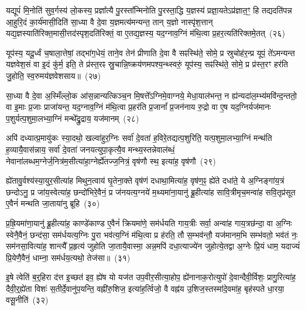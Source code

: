 यद्यूपं॑ मि॒नोति॑ सुव॒र्गस्य॑ लो॒कस्य॒ प्रज्ञा᳚त्यै पु॒रस्ता᳚न्मिनोति पु॒रस्ता॒द्धि य॒ज्ञस्य॑ प्रज्ञा॒यते\-ऽप्र॑ज्ञात॒ꣳ॒ हि तद्यदति॑पन्न आ॒हुरि॒दं का॒र्य॑मासी॒दिति॑ सा॒ध्या वै दे॒वा य॒ज्ञमत्य॑मन्यन्त॒ तान् य॒ज्ञो नास्पृ॑श॒त्तान् यद्य॒ज्ञस्याति॑रिक्त॒मासी॒त्तद॑स्पृश॒\-दति॑रिक्तं॒ वा ए॒तद्य॒ज्ञस्य॒ यद॒ग्नाव॒ग्निं म॑थि॒त्वा प्र॒हर॒त्यति॑रिक्तमे॒तत्~(२६)\ip

यूप॑स्य॒ यदू॒र्ध्वं च॒षाला॒त्तेषां॒ तद्भा॑ग॒धेयं॒ ताने॒व तेन॑ प्रीणाति दे॒वा वै सꣴस्थि॑ते॒ सोमे॒ प्र स्रुचोह॑र॒न्प्र यूपं॒ ते॑\-ऽमन्यन्त यज्ञवेश॒सं वा इ॒दं कु॑र्म॒ इति॒ ते प्र॑स्त॒रꣴ स्रु॒चान्नि॒ष्क्रय॑णमपश्य॒न्थ्स्वरुं॒ यूप॑स्य॒ सꣴस्थि॑ते॒ सोमे॒ प्र प्र॑स्त॒रꣳ हर॑ति जु॒होति॒ स्व॒रुमय॑ज्ञवेशसाय॥~(२७)\ip

{}

सा॒ध्या वै दे॒वा अ॒स्मिँल्लो॒क आ॑स॒न्नान्यत्किञ्च॒न मि॒षत्ते᳚\-ऽग्निमे॒वाग्नये॒ मेधा॒याल॑भन्त॒ न ह्य॑न्यदा॑ल॒म्भ्य॑मवि॑न्द॒न्ततो॒ वा इ॒माः प्र॒जाः प्राजा॑यन्त॒ यद॒ग्नाव॒ग्निं म॑थि॒त्वा प्र॒हर॑ति प्र॒जानां᳚ प्र॒जन॑नाय रु॒द्रो वा ए॒ष यद॒ग्निर्यज॑मानः प॒शुर्यत्प॒शुमा॒लभ्या॒ग्निं मन्थे᳚द्रु॒द्राय॒ यज॑मानम्~(२८)\ip

अपि॑ दध्यात्प्र॒मायु॑कः स्या॒दथो॒ खल्वा॑हुर॒ग्निः सर्वा॑ दे॒वता॑ ह॒विरे॒तद्यत्प॒शुरिति॒ यत्प॒शुमा॒लभ्या॒ग्निं मन्थ॑ति ह॒व्यायै॒वास॑न्नाय॒ सर्वा॑ दे॒वता॑ जनयत्युपा॒कृत्यै॒व मन्थ्य॒स्तन्नेवाल॑ब्धं॒ नेवाना॑लब्धम॒ग्नेर्ज॒नित्र॑म॒सीत्या॑हा॒ग्नेर्\mbox{}ह्ये॑तज्ज॒नित्रं॒ वृष॑णौ स्थ॒ इत्या॑ह॒ वृष॑णौ~(२९)\ip

ह्ये॑तावु॒र्वश्य॑स्या॒युर॒सीत्या॑ह मिथुन॒त्वाय॑ घृ॒तेना॒क्ते वृष॑णं दधाथा॒मित्या॑ह॒ वृष॑ण॒ꣴ॒ ह्ये॑ते दधा॑ते॒ ये अ॒ग्निङ्गा॑य॒त्रं छन्दो\-ऽनु॒ प्र जा॑य॒स्वेत्या॑ह॒ छन्दो॑भिरे॒वैनं॒ प्र ज॑नयत्य॒ग्नये॑ म॒थ्यमा॑ना॒यानु॑ ब्रू॒हीत्या॑ह सावि॒त्रीमृच॒मन्वा॑ह सवि॒तृप्र॑सूत ए॒वैनं॑ मन्थति जा॒ताया॑नु ब्रूहि~(३०)\ip

प्र॒ह्रि॒यमा॑णा॒यानु॑ ब्रू॒हीत्या॑ह॒ काण्डे॑काण्ड ए॒वैनं॑ क्रियमा॑णे॒ सम॑र्धयति गाय॒त्रीः सर्वा॒ अन्वा॑ह गाय॒त्रछ॑न्दा॒ वा अ॒ग्निः स्वेनै॒वैनं॒ छन्द॑सा॒ सम॑र्धयत्य॒ग्निः पु॒रा भव॑त्य॒ग्निं म॑थि॒त्वा प्र ह॑रति॒ तौ स॒म्भव॑न्तौ॒ यज॑मानम॒भि सम्भ॑वतो॒ भव॑तं नः॒ सम॑नसा॒वित्या॑ह॒ शान्त्यै᳚ प्र॒हृत्य॑ जुहोति जा॒तायै॒वास्मा॒ अन्न॒मपि॑ दधा॒त्याज्ये॑न जुहोत्ये॒तद्वा अ॒ग्नेः प्रि॒यं धाम॒ यदाज्यं॑ प्रि॒येणै॒वैनं॒ धाम्ना॒ सम॑र्धय॒त्यथो॒ तेज॑सा॥~(३१)\ip

{\anuvakamend[{यज॑मानमाह॒ वृष॑णौ जाता॒यानु॑ब्रू॒ह्यप्य॒ष्टाद॑श च}]}

इ॒षे त्वेति॑ ब॒र्॒\mbox{}हिरा द॑त्त इ॒च्छत॑ इव॒ ह्ये॑ष यो यज॑त उप॒वीर॒सीत्या॒होप॒ ह्ये॑नानाक॒रोत्युपो॑ दे॒वान्दैवी॒र्विशः॒ प्रागु॒रित्या॑ह॒ दैवी॒र्॒\mbox{}ह्ये॑ता विशः॑ स॒तीर्दे॒वानु॑प॒यन्ति॒ वह्नी॑रु॒शिज॒ इत्या॑ह॒र्त्विजो॒ वै वह्न॑य उ॒शिज॒स्तस्मा॑दे॒वमा॑ह॒ बृह॑स्पते धा॒रया॒ वसू॒नीति॑~(३२)\ip

